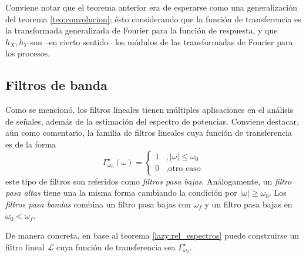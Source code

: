 \documentclass[12pt,letterpaper]{book}
\newcommand{\abso}[1]{\left| #1 \right|}
\begin{document}
Conviene notar que el teorema anterior era de esperarse como una generalización del teorema \ref{teo:convolucion}; ésto considerando que la función de transferencia es la transformada generalizada de Fourier para la función de respuesta, y que $h_X, h_Y$ son --en cierto sentido-- los módulos de las transformadas de Fourier para los procesos.


\subsection{Filtros de banda}

Como se mencionó, los filtros lineales tienen múltiples aplicaciones en el análisis de señales, además de la estimación del espectro de potencias.
%
Conviene destacar, aún como comentario, la familia de filtros lineales cuya función de transferencia es de la forma
\begin{equation}
\Gamma_{\omega_0}^{\star} (\omega) = \begin{cases}
1 &, \abso{\omega} \leq \omega_0 \\
0 &, \text{otro caso}
\end{cases}
\end{equation}
este tipo de filtros son referidos como \textit{filtros pasa bajas}.
%
Análogamente, un \textit{filtro pasa altas} tiene una la misma forma cambiando la condición por $\abso{\omega} \geq \omega_0$.
%
Los \textit{filtros pasa bandas} combina un filtro pasa bajas con $\omega_f$ y un filtro pasa bajas en $\omega_0 < \omega_f$.

De manera concreta, en base al teorema \ref{lazy:rel_espectros} puede construirse un filtro lineal $\mathcal{L}$ cuya función de transferencia sea $\Gamma_{\omega_0}^{\star}$.
\end{document}
